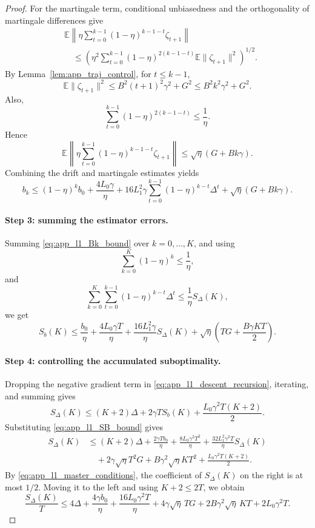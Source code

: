 \documentclass[letter,11pt]{article}
\newcommand{\E}{\mathbb{E}}
\begin{document}
\begin{proof}
For the martingale term, conditional unbiasedness and the orthogonality of
martingale differences give
\[
\begin{aligned}
    &\E\left\|
    \eta\sum_{t=0}^{k-1}(1-\eta)^{k-1-t}\zeta_{t+1}
    \right\| \\
    &\quad\le
    \left(
    \eta^2\sum_{t=0}^{k-1}(1-\eta)^{2(k-1-t)}
    \E\|\zeta_{t+1}\|^2
    \right)^{1/2}.
\end{aligned}
\]
By Lemma~\ref{lem:app_traj_control}, for \(t\le k-1\),
\[
    \E\|\zeta_{t+1}\|^2
    \le
    B^2(t+1)^2\gamma^2+G^2
    \le
    B^2k^2\gamma^2+G^2.
\]
Also,
\[
    \sum_{t=0}^{k-1}(1-\eta)^{2(k-1-t)}
    \le
    \frac1\eta.
\]
Hence
\[
    \E\left\|
    \eta\sum_{t=0}^{k-1}(1-\eta)^{k-1-t}\zeta_{t+1}
    \right\|
    \le
    \sqrt{\eta}(G+Bk\gamma).
\]
Combining the drift and martingale estimates yields
\begin{equation}
\label{eq:app_l1_Bk_bound}
    b_k
    \le
    (1-\eta)^kb_0
    +\frac{4L_0\gamma}{\eta}
    +16L_1^2\gamma
    \sum_{t=0}^{k-1}(1-\eta)^{k-t}\Delta^t
    +\sqrt\eta(G+Bk\gamma).
\end{equation}

\paragraph{Step 3: summing the estimator errors.}
Summing \eqref{eq:app_l1_Bk_bound} over \(k=0,\ldots,K\), and using
\[
    \sum_{k=0}^K(1-\eta)^k\le \frac1\eta,
\]
and
\[
    \sum_{k=0}^K\sum_{t=0}^{k-1}(1-\eta)^{k-t}\Delta^t
    \le
    \frac1\eta S_\Delta(K),
\]
we get
\begin{equation}
\label{eq:app_l1_SB_bound}
    S_b(K)
    \le
    \frac{b_0}{\eta}
    +\frac{4L_0\gamma T}{\eta}
    +\frac{16L_1^2\gamma}{\eta}S_\Delta(K)
    +\sqrt\eta
    \left(TG+\frac{B\gamma KT}{2}\right).
\end{equation}

\paragraph{Step 4: controlling the accumulated suboptimality.}
Dropping the negative gradient term in
\eqref{eq:app_l1_descent_recursion}, iterating, and summing gives
\[
    S_\Delta(K)
    \le
    (K+2)\Delta
    +2\gamma T S_b(K)
    +\frac{L_0\gamma^2T(K+2)}{2}.
\]
Substituting \eqref{eq:app_l1_SB_bound} gives
\[
\begin{aligned}
S_\Delta(K)
&\le
(K+2)\Delta
+\frac{2\gamma T b_0}{\eta}
+\frac{8L_0\gamma^2T^2}{\eta}
+\frac{32L_1^2\gamma^2T}{\eta}S_\Delta(K) \\
&\quad
+2\gamma\sqrt\eta T^2G
+B\gamma^2\sqrt\eta KT^2
+\frac{L_0\gamma^2T(K+2)}{2}.
\end{aligned}
\]
By \eqref{eq:app_l1_master_conditions}, the coefficient of
\(S_\Delta(K)\) on the right is at most \(1/2\). Moving it to the left and
using \(K+2\le2T\), we obtain
\begin{equation}
\label{eq:app_l1_Sdelta_avg_bound}
\frac{S_\Delta(K)}{T}
\le
4\Delta
+\frac{4\gamma b_0}{\eta}
+\frac{16L_0\gamma^2T}{\eta}
+4\gamma\sqrt\eta\,TG
+2B\gamma^2\sqrt\eta\,KT
+2L_0\gamma^2T.
\end{equation}


\end{proof}
\end{document}
